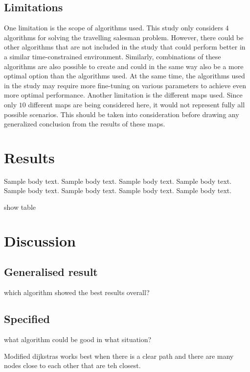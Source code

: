 \documentclass{article}
\begin{document}
\subsection{Limitations}\label{Limitations}
One limitation is the scope of algorithms used. This study only considers $4$ algorithms for solving the travelling salesman problem. However, there could be other algorithms that are not included in the study that could perform better in a similar time-constrained environment. Similarly, combinations of these algorithms are also possible to create and could in the same way also be a more optimal option than the algorithms used. 
\noindent
At the same time, the algorithms used in the study may require more fine-tuning on various parameters to achieve even more optimal performance. 
\noindent
Another limitation is the different maps used. Since only $10$ different maps are being considered here, it would not represent fully all possible scenarios. This should be taken into consideration before drawing any generalized conclusion from the results of these maps.


\section{Results}\label{Results}

Sample body text. Sample body text. Sample body text. Sample body text. Sample body text. Sample body text. Sample body text. Sample body text.

show table






\section{Discussion}\label{sec4}


\subsection{Generalised result}\label{subsec1}
which algorithm showed the best results overall?


\subsection{Specified }\label{subsec2}
what algorithm could be good in what situation?

Modified dijkstras works best when there is a clear path and there are many nodes close to each other that are teh closest. 
\end{document}

